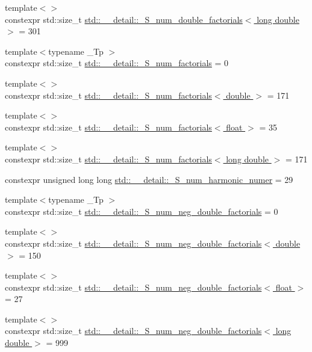 \begin{DoxyCompactItemize}
{\footnotesize template$<$$>$ }\\constexpr std\+::size\+\_\+t \hyperlink{namespacestd_1_1____detail_a46272d8c219cfca2054da99471ed3711}{std\+::\+\_\+\+\_\+detail\+::\+\_\+\+S\+\_\+num\+\_\+double\+\_\+factorials$<$ long double $>$} = 301
\item 
{\footnotesize template$<$typename \+\_\+\+Tp $>$ }\\constexpr std\+::size\+\_\+t \hyperlink{namespacestd_1_1____detail_a671f3ba94c1b06be87992486bca37426}{std\+::\+\_\+\+\_\+detail\+::\+\_\+\+S\+\_\+num\+\_\+factorials} = 0
\item 
{\footnotesize template$<$$>$ }\\constexpr std\+::size\+\_\+t \hyperlink{namespacestd_1_1____detail_ad415b9ec36471d7aca4ebcd22cb7b216}{std\+::\+\_\+\+\_\+detail\+::\+\_\+\+S\+\_\+num\+\_\+factorials$<$ double $>$} = 171
\item 
{\footnotesize template$<$$>$ }\\constexpr std\+::size\+\_\+t \hyperlink{namespacestd_1_1____detail_a3a29651303ca2222246ef6f0a17e92ec}{std\+::\+\_\+\+\_\+detail\+::\+\_\+\+S\+\_\+num\+\_\+factorials$<$ float $>$} = 35
\item 
{\footnotesize template$<$$>$ }\\constexpr std\+::size\+\_\+t \hyperlink{namespacestd_1_1____detail_ab90b8eb39ff963a5ed533a3be0b7f7fd}{std\+::\+\_\+\+\_\+detail\+::\+\_\+\+S\+\_\+num\+\_\+factorials$<$ long double $>$} = 171
\item 
constexpr unsigned long long \hyperlink{namespacestd_1_1____detail_a554788747841f6abbfd7572673df32ad}{std\+::\+\_\+\+\_\+detail\+::\+\_\+\+S\+\_\+num\+\_\+harmonic\+\_\+numer} = 29
\item 
{\footnotesize template$<$typename \+\_\+\+Tp $>$ }\\constexpr std\+::size\+\_\+t \hyperlink{namespacestd_1_1____detail_ac386f200e589ce1fc895c2aac0e47f8c}{std\+::\+\_\+\+\_\+detail\+::\+\_\+\+S\+\_\+num\+\_\+neg\+\_\+double\+\_\+factorials} = 0
\item 
{\footnotesize template$<$$>$ }\\constexpr std\+::size\+\_\+t \hyperlink{namespacestd_1_1____detail_a2d14a1207a6fea22f32586dfd41cf49d}{std\+::\+\_\+\+\_\+detail\+::\+\_\+\+S\+\_\+num\+\_\+neg\+\_\+double\+\_\+factorials$<$ double $>$} = 150
\item 
{\footnotesize template$<$$>$ }\\constexpr std\+::size\+\_\+t \hyperlink{namespacestd_1_1____detail_a3ce62e66e9a196fd89b4d841f7374d68}{std\+::\+\_\+\+\_\+detail\+::\+\_\+\+S\+\_\+num\+\_\+neg\+\_\+double\+\_\+factorials$<$ float $>$} = 27
\item 
{\footnotesize template$<$$>$ }\\constexpr std\+::size\+\_\+t \hyperlink{namespacestd_1_1____detail_a2ef051ec96e521e71489d2327d11c22a}{std\+::\+\_\+\+\_\+detail\+::\+\_\+\+S\+\_\+num\+\_\+neg\+\_\+double\+\_\+factorials$<$ long double $>$} = 999
\end{DoxyCompactItemize}


